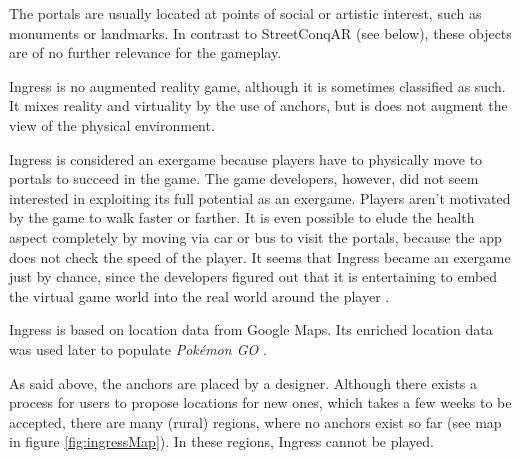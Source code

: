 The portals are usually located at points of social or artistic interest, such as monuments or landmarks. In contrast to StreetConqAR (see below), these objects are of no further relevance for the gameplay.

Ingress is no augmented reality game, although it is sometimes classified as such. It mixes reality and virtuality by the use of anchors, but is does not augment the view of the physical environment.

Ingress is considered an exergame because players have to physically move to portals to succeed in the game. The game developers, however, did not seem interested in exploiting its full potential as an exergame. Players aren't motivated by the game to walk faster or farther. It is even possible to elude the health aspect completely by moving via car or bus to visit the portals, because the app does not check the speed of the player. It seems that Ingress became an exergame just by chance, since the developers figured out that it is entertaining to embed the virtual game world into the real world around the player \citep{knoll2014urban}.

Ingress is based on location data from Google Maps. Its enriched location data was used later to populate \emph{Pok\'{e}mon GO} \citep{Ingress}.

As said above, the anchors are placed by a designer. Although there exists a process for users to propose locations for new ones, which takes a few weeks to be accepted, there are many (rural) regions, where no anchors exist so far (see map in figure \ref{fig:ingressMap}). In these regions, Ingress cannot be played.


